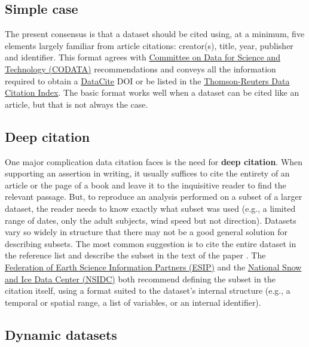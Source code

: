 \documentclass[10pt,a4paper,twocolumn]{article}
\begin{document}
{{\subsection*{Simple case}\label{simple-case}

The present consensus is that a dataset should be cited using, at a minimum, five elements largely familiar from article citations: creator(s), title, year, publisher and identifier.
This format agrees with \href{http://www.codata.org/}{Committee on Data for Science and Technology (CODATA)} recommendations\cite{codata-icsti_task_group_on_data_citation_standards_and_practices_out_2013} and conveys all the information required to obtain a \href{http://www.datacite.org/}{DataCite} DOI\cite{starr_iscitedby:_2011} or be listed in the \href{http://thomsonreuters.com/data-citation-index/}{Thomson-Reuters Data Citation Index}.
The basic format works well when a dataset can be cited like an article, but that is not always the case.

\subsection*{Deep citation}\label{deep-citation}

One major complication data citation faces is the need for \textbf{deep citation}.
When supporting an assertion in writing, it usually suffices to cite the entirety of an article or the page of a book and leave it to the inquisitive reader to find the relevant passage.
But, to reproduce an analysis performed on a subset of a larger dataset, the reader needs to know exactly what subset was used (e.g., a limited range of dates, only the adult subjects, wind speed but not direction).
Datasets vary so widely in structure that there may not be a good general solution for describing subsets.
The most common suggestion is to cite the entire dataset in the reference list and describe the subset in the text of the paper \cite{altman_proposed_2007}.
The \href{http://wiki.esipfed.org/index.php/Interagency_Data_Stewardship/Citations/provider_guidelines#Subset_Used}{Federation of Earth Science Information Partners (ESIP)} and the \href{http://nsidc.org/about/use_copyright.html}{National Snow and Ice Data Center (NSIDC)} both recommend defining the subset in the citation itself, using a format suited to the dataset's internal structure (e.g., a temporal or spatial range, a list of variables, or an internal identifier).

\subsection*{Dynamic datasets}\label{dynamic-data}

}}
\end{document}
